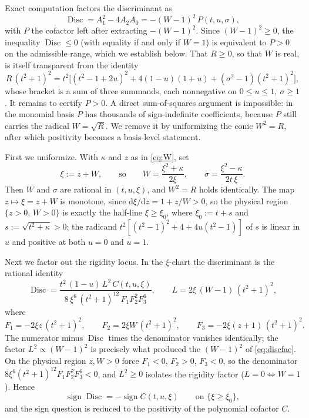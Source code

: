\documentclass[11pt]{article}
\theoremstyle{plain}
\theoremstyle{definition}
\newcommand{\dd}{\mathrm{d}}
\newcommand{\Disc}{\operatorname{Disc}}
\begin{document}
Exact computation factors the discriminant as
\begin{equation}\label{eq:discfac}
  \Disc=A_1^2-4A_2A_0=-(W-1)^2\,P(t,u,\sigma),
\end{equation}
with $P$ the cofactor left after extracting $-(W-1)^2$. Since $(W-1)^2\ge0$, the inequality $\Disc\le0$ (with
equality if and only if $W=1$) is equivalent to $P>0$ on the admissible range, which we establish below. That
$R\ge0$, so that $W$ is real, is itself transparent
from the identity
\begin{equation*}
  R\,(t^2+1)^2=t^2\Big[(t^2-1+2u)^2+4(1-u)(1+u)+(\sigma^2-1)(t^2+1)^2\Big],
\end{equation*}
whose bracket is a sum of three summands, each nonnegative on $0\le u\le1,\ \sigma\ge1$. It remains to certify
$P>0$. A direct sum-of-squares argument is impossible: in the monomial basis $P$ has thousands of
sign-indefinite coefficients, because $P$ still carries the radical $W=\sqrt R$. We remove it by uniformizing
the conic $W^2=R$, after which positivity becomes a basis-level statement.

First we uniformize. With $\kappa$ and $z$ as in \eqref{eq:W}, set
\begin{equation}\label{eq:uni}
  \xi:=z+W,\qquad\text{so}\qquad W=\frac{\xi^2+\kappa}{2\xi},\qquad \sigma=\frac{\xi^2-\kappa}{2t\,\xi}.
\end{equation}
Then $W$ and $\sigma$ are rational in $(t,u,\xi)$, and $W^2=R$ holds identically. The map $z\mapsto\xi=z+W$ is
monotone, since $\dd\xi/\dd z=1+z/W>0$, so the physical region $\{z>0,\,W>0\}$ is exactly the half-line
$\xi\ge\xi_0$, where $\xi_0:=t+s$ and $s:=\sqrt{t^2+\kappa}>0$; the radicand
$t^2[(t^2-1)^2+4+4u(t^2-1)]$ of $s$ is linear in $u$ and positive at both $u=0$ and $u=1$.

Next we factor out the rigidity locus. In the $\xi$-chart the discriminant is the rational identity
\begin{equation*}
  \Disc=\frac{t^2\,(1-u)\,L^2\,C(t,u,\xi)}{8\,\xi^6\,(t^2+1)^{12}\,F_1F_2^2F_3^6},
  \qquad L=2\xi\,(W-1)\,(t^2+1)^2,
\end{equation*}
where
\begin{equation*}
  F_1=-2\xi z\,(t^2+1)^2,\qquad F_2=2\xi W\,(t^2+1)^2,\qquad F_3=-2\xi(z+1)\,(t^2+1)^2.
\end{equation*}
The numerator minus $\Disc$ times the denominator vanishes identically; the factor $L^2\propto(W-1)^2$ is
precisely what produced the $(W-1)^2$ of \eqref{eq:discfac}. On the physical region $z,W>0$ force
$F_1<0$, $F_2>0$, $F_3<0$, so the denominator $8\xi^6(t^2+1)^{12}F_1F_2^2F_3^6<0$, and $L^2\ge0$ isolates the
rigidity factor ($L=0\Leftrightarrow W=1$). Hence
\begin{equation}\label{eq:signreduce}
  \operatorname{sign}\Disc=-\operatorname{sign}C(t,u,\xi)\qquad\text{on }\{\xi\ge\xi_0\},
\end{equation}
and the sign question is reduced to the positivity of the polynomial cofactor $C$.
\end{document}

